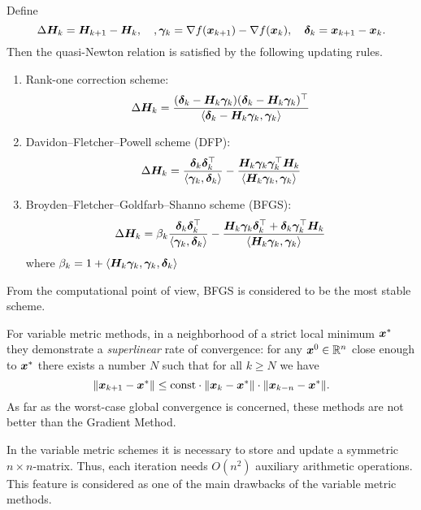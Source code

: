 Define
\[
    \Delta \bm{H}_k = \bm{H}_{k+1} - \bm{H}_k, \quad, \bm{\gamma}_k = \nabla f(\bm{x}_{k+1}) - \nabla f(\bm{x}_k), \quad \bm{\delta}_k = \bm{x}_{k+1} - \bm{x}_k.  
\]
Then the quasi-Newton relation is satisfied by the following updating rules.
\begin{enumerate}
    \item {Rank-one correction scheme}:
        \[
            \Delta \bm{H}_k = \frac{(\bm{\delta}_k - \bm{H}_k\bm{\gamma}_k)(\bm{\delta}_k - \bm{H}_k\bm{\gamma}_k)^\top}{\left\langle \bm{\delta}_k - \bm{H}_k\bm{\gamma}_k, \bm{\gamma}_k \right\rangle}  
        \]
    \item {Davidon–Fletcher–Powell scheme (DFP)}:
        \[
            \Delta \bm{H}_k = \frac{\bm{\delta}_k\bm{\delta}_k^\top}{\left\langle \bm{\gamma}_k, \bm{\delta}_k \right\rangle} 
            - \frac{\bm{H}_k\bm{\gamma}_k\bm{\gamma}_k^\top\bm{H}_k}{\left\langle \bm{H}_k\bm{\gamma}_k, \bm{\gamma}_k \right\rangle}
        \]
    \item {Broyden–Fletcher–Goldfarb–Shanno scheme (BFGS)}:
        \[
            \Delta \bm{H}_k = \beta_k \frac{\bm{\delta}_k\bm{\delta}_k^\top}{\left\langle \bm{\gamma}_k, \bm{\delta}_k \right\rangle} 
            - \frac{\bm{H}_k\bm{\gamma}_k\bm{\delta}_k^\top + \bm{\delta}_k\bm{\gamma}_k^\top\bm{H}_k}{\left\langle \bm{H}_k\bm{\gamma}_k, \bm{\gamma}_k \right\rangle}
        \]
        where \(\beta_k = 1 + \left\langle \bm{H}_k\bm{\gamma}_k, \bm{\gamma}_k, \bm{\delta}_k \right\rangle\)
\end{enumerate}
From the computational point of view, BFGS is considered to be the most stable scheme.

For variable metric methods, in a neighborhood of a strict local minimum \(\bm{x}^*\) they demonstrate a \emph{superlinear} rate of convergence:
for any \(\bm{x}^0 \in \mathbb{R}^n\) close enough to \(\bm{x}^*\) there exists a number \(N\) such that for all \(k \ge N\) we have
\[
    \norm{\bm{x}_{k+1} - \bm{x}^*} \le \text{const} \cdot \norm{\bm{x}_k - \bm{x}^*} \cdot \norm{\bm{x}_{k-n} - \bm{x}^*}.  
\]
As far as the worst-case global convergence is concerned, these methods are not better than the Gradient Method.

In the variable metric schemes it is necessary to store and update a symmetric \(n \times n\)-matrix. Thus, each iteration needs \(O(n^2)\) auxiliary arithmetic operations.
This feature is considered as one of the main drawbacks of the variable metric
methods.

